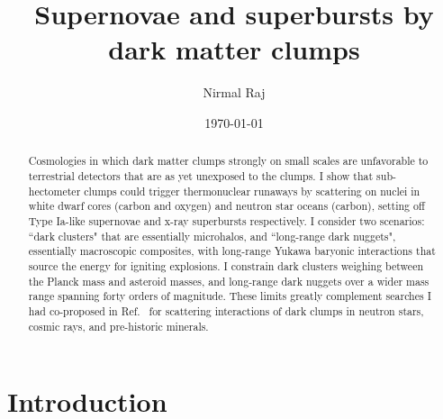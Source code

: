 \documentclass[
    twocolumn,
	prd,
        amssymb,
	preprintnumbers,
	secnumarabic,
	nofootinbib,
	superscriptaddress]{revtex4-1}
\begin{document}
\title{Supernovae and superbursts by dark matter clumps}


\author{Nirmal Raj}


\date{\today}

\begin{abstract}

Cosmologies in which dark matter clumps strongly on small scales are unfavorable to terrestrial detectors that are as yet unexposed to the clumps.
I show that sub-hectometer clumps could trigger thermonuclear runaways by scattering on nuclei in white dwarf cores (carbon and oxygen) and neutron star oceans (carbon), setting off Type Ia-like supernovae and x-ray superbursts respectively.
I consider two scenarios: ``dark clusters" that are essentially microhalos, and ``long-range dark nuggets", essentially macroscopic composites, with long-range Yukawa baryonic interactions that source the energy for igniting explosions.
I constrain dark clusters weighing between the Planck mass and asteroid masses, and long-range dark nuggets over a wider mass range spanning forty orders of magnitude.
These limits greatly complement searches I had co-proposed in Ref.~\cite{NSvIR:clumps2021} for scattering interactions of dark clumps in neutron stars, cosmic rays, and pre-historic minerals.  


\end{abstract}

\maketitle


\section{Introduction}
\end{document}
